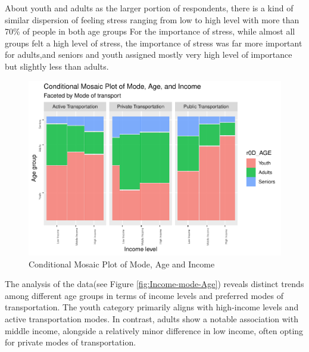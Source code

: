 \documentclass[
11pt, %
oneside, %
english, %
singlespacing, %
]{macthesis} %
\begin{document}
About youth and adults as the larger portion of respondents, there is a kind of similar dispersion of feeling stress ranging from low to high level with more than 70\% of people in both age groups For the importance of stress, while almost all groups felt a high level of stress, the importance of stress was far more important for adults,and seniors and youth assigned mostly very high level of importance but slightly less than adults.
\begin{figure}
\includegraphics[width=0.85\linewidth]{thesis_files/figure-latex/unnamed-chunk-28-1} \caption{\label{fig:Income-mode-Age}Conditional Mosaic Plot of Mode,  Age and Income}\label{fig:unnamed-chunk-28}
\end{figure}
The analysis of the data(see Figure \ref{fig:Income-mode-Age}) reveals distinct trends among different age groups in terms of income levels and preferred modes of transportation. The youth category primarily aligns with high-income levels and active transportation modes. In contrast, adults show a notable association with middle income, alongside a relatively minor difference in low income, often opting for private modes of transportation.
\end{document}
